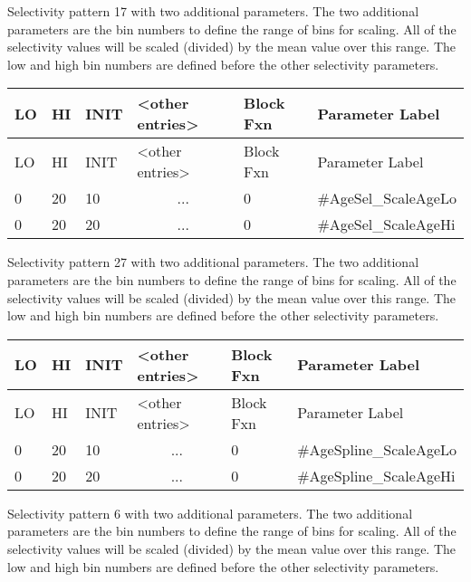 Selectivity pattern 17 with two additional parameters. The two additional parameters are the bin numbers to define the range of bins for scaling. All of the selectivity values will be scaled (divided) by the mean value over this range. The low and high bin numbers are defined before the other selectivity parameters.

	\begin{longtable}{p{1cm} p{1cm} p{1cm} p{2.9cm}  p{1.9cm}  p{4.2cm}}
		\hline
		LO \Tstrut & HI & INIT  &  <other entries> & Block Fxn & Parameter Label\Bstrut\\
		\hline
		\endfirsthead
	
		\hline
		LO \Tstrut & HI & INIT & <other entries> & Block Fxn & Parameter Label\Bstrut\\
		\hline
		\endhead

		0 & 20 & 10 & \multicolumn{1}{c}{...} & 0 & \#AgeSel\_ScaleAgeLo \Tstrut\\
		0 & 20 & 20 & \multicolumn{1}{c}{...} & 0 & \#AgeSel\_ScaleAgeHi \Bstrut\\
		\hline
	\end{longtable}


Selectivity pattern 27 with two additional parameters. The two additional parameters are the bin numbers to define the range of bins for scaling. All of the selectivity values will be scaled (divided) by the mean value over this range. The low and high bin numbers are defined before the other selectivity parameters.

	\begin{longtable}{p{1cm} p{1cm} p{1cm} p{2.9cm}  p{1.9cm}  p{4.2cm}}
		\hline
		LO \Tstrut & HI & INIT  &  <other entries> & Block Fxn & Parameter Label\Bstrut\\
		\hline
		\endfirsthead
	
		\hline
		LO \Tstrut & HI & INIT & <other entries> & Block Fxn & Parameter Label\Bstrut\\
		\hline
		\endhead

		0 & 20 & 10 & \multicolumn{1}{c}{...} & 0 & \#AgeSpline\_ScaleAgeLo\Tstrut\\
		0 & 20 & 20 & \multicolumn{1}{c}{...} & 0 & \#AgeSpline\_ScaleAgeHi\Bstrut\\
		\hline
	\end{longtable}

Selectivity pattern 6 with two additional parameters. The two additional parameters are the bin numbers to define the range of bins for scaling. All of the selectivity values will be scaled (divided) by the mean value over this range. The low and high bin numbers are defined before the other selectivity parameters.
	
